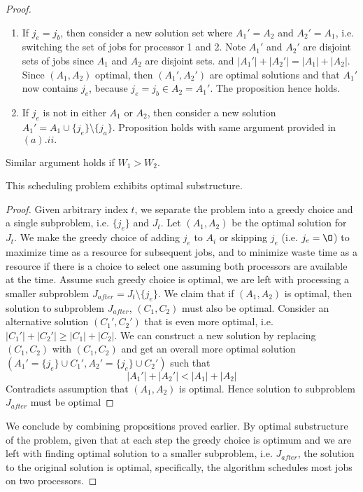 \documentclass[11pt]{article}
\begin{document}
\begin{enumerate}
\begin{proof}
\begin{enumerate}
\begin{enumerate}
        \begin{enumerate}
          \item If $j_e = j_b$, then consider a new solution set where $A_1' = A_2$ and $A_2' = A_1$, i.e. switching the set of jobs for processor 1 and 2. Note $A_1'$ and $A_2'$ are disjoint sets of jobs since $A_1$ and $A_2$ are disjoint sets. and $|A_1'| + |A_2'| = |A_1| + |A_2|$. Since $(A_1, A_2)$ optimal, then $(A_1', A_2')$ are optimal solutions and that $A_1'$ now contains $j_e$, because $j_e = j_b \in A_2 = A_1'$. The proposition hence holds.
          \item If $j_e$ is not in either $A_1$ or $A_2$, then consider a new solution $A_1' = A_1 \cup \{ j_e\} \setminus \{ j_a \}$. Proposition holds with same argument provided in $(a). ii.$
        \end{enumerate}
      \end{enumerate}
      Similar argument holds if $W_1 > W_2$.
    \end{enumerate}


    \begin{proposition*}
      This scheduling problem exhibits optimal substructure.
    \end{proposition*}
    \begin{proof}
      Given arbitrary index $t$, we separate the problem into a greedy choice and a single subproblem, i.e. $\{ j_e \}$ and $J_t$. Let $(A_1, A_2)$ be the optimal solution for $J_t$. We make the greedy choice of adding $j_e$ to $A_i$ or skipping $j_e$ (i.e. $j_e = \O$) to maximize time as a resource for subsequent jobs, and to minimize waste time as a resource if there is a choice to select one assuming both processors are available at the time. Assume such greedy choice is optimal, we are left with processing a smaller subproblem $J_{after} = J_t \setminus \{ j_e \}$. We claim that if $(A_1, A_2)$ is optimal, then solution to subproblem $J_{after}$, $(C_1, C_2)$ must also be optimal. Consider an alternative solution $(C_1', C_2')$ that is even more optimal, i.e. $|C_1'| + |C_2'| \geq |C_1| + |C_2|$. We can construct a new solution by replacing $(C_1, C_2)$ with $(C_1, C_2)$ and get an overall more optimal solution $(A_1' = \{ j_e \} \cup C_1', A_2' = \{ j_e \}\cup C_2')$ such that
      \[
        |A_1'| + |A_2'| < |A_1| + |A_2|
      \]
      Contradicts assumption that $(A_1, A_2)$ is optimal. Hence solution to subproblem $J_{after}$ must be optimal
    \end{proof}

    We conclude by combining propositions proved earlier. By optimal substructure of the problem, given that at each step the greedy choice is optimum and we are left with finding optimal solution to a smaller subproblem, i.e. $J_{after}$, the solution to the original solution is optimal, specifically, the algorithm schedules most jobs on two processors.
  \end{proof}


\end{enumerate}
\end{document}
